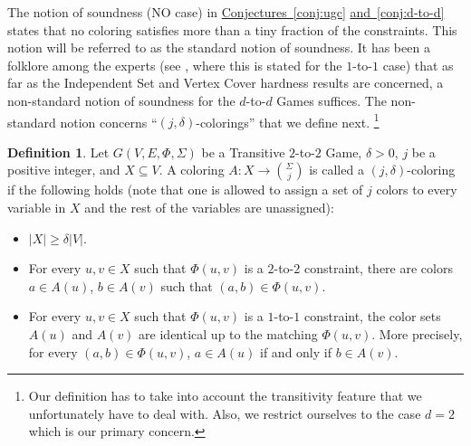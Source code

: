 \documentclass[11pt]{article}
\numberwithin{equation}{section}
\theoremstyle{definition}
\newtheorem{definition}[theorem]{Definition}
\theoremstyle{plain}
\newcommand{\expref}[2]{\hyperref[#2]{#1~\ref{#2}}}
\newcommand\card[1]{\left| {#1} \right|}
\begin{document}
The notion of soundness (NO case) in \expref{Conjectures}{conj:ugc} \expref{and}{conj:d-to-d} states that no coloring satisfies more than a tiny fraction of
the constraints. This notion will be referred to as the standard notion of soundness.
It has been a folklore among the experts (see \cite[Theorem 3.1]{KR08},
where this is stated for the $1$-to-$1$ case) that as far as the Independent Set and Vertex Cover
hardness results are concerned, a non-standard notion of soundness for the $d$-to-$d$ Games suffices. The non-standard notion concerns
``$(j,\delta)$-colorings'' that we define next. \footnote{Our definition has to take into account the transitivity feature that we unfortunately
have to deal with. Also, we restrict ourselves to the case $d=2$ which is our primary concern.}

\begin{definition}\label{def:j,delta}
Let $G(V,E,\Phi,\Sigma)$ be a Transitive $2$-to-$2$ Game, $\delta>0$, $j$ be a positive integer, and $X\subseteq V$.
A coloring $A \colon X\to {\Sigma \choose j}$ is called a $(j,\delta)$-coloring if the following holds
(note that one is allowed to assign a set of $j$ colors to every variable in $X$ and the rest of the variables are
unassigned):
\begin{itemize}
\item $\card{X}\geqslant \delta \card{V}$.
\item For every $u,v\in X$ such that $\Phi(u,v)$ is a $2$-to-$2$ constraint, there are colors $a \in A(u)$, $b \in A(v)$ such that
$(a,b)\in \Phi(u,v)$.
\item For every $u,v\in X$ such that $\Phi(u,v)$ is a $1$-to-$1$ constraint, the color sets $A(u)$ and $A(v)$ are identical up to
the matching $\Phi(u,v)$. More precisely, for every $(a,b) \in \Phi(u,v)$, $a \in A(u)$ if and only if $b \in A(v)$.
\end{itemize}
\end{definition}
\end{document}
